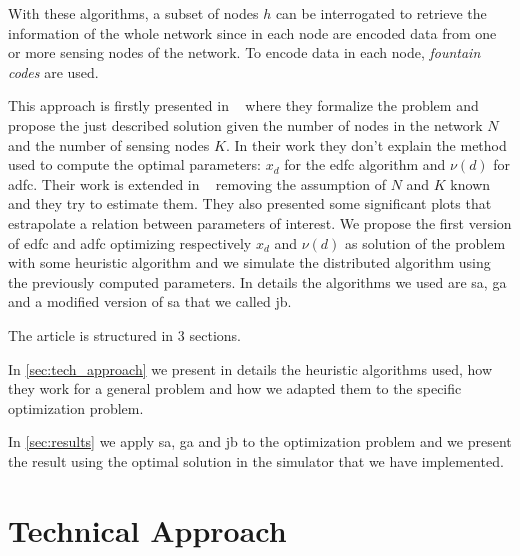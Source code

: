 \documentclass[journal]{IEEEtran}
\begin{document}
With these algorithms, a subset of nodes $h$ can be interrogated to retrieve the information of the whole network since in each node are encoded data from one or more sensing nodes of the network.
To encode data in each node, \textit{fountain codes} are used.

This approach is firstly presented in ~\cite{Lin2007} where they formalize the problem and propose the just described solution given the number of nodes in the network $N$ and the number of sensing nodes $K$. In their work they don't explain the method used to compute the optimal parameters: $x_d$ for the \gls{edfc} algorithm and $\nu(d)$ for \gls{adfc}. Their work is extended in ~\cite{Aly2008} removing the assumption of $N$ and $K$ known and they try to estimate them.
They also presented some significant plots that estrapolate a relation between parameters of interest.
We propose the first version of \gls{edfc} and \gls{adfc} optimizing respectively $x_d$ and $\nu(d)$ as solution of the problem with some heuristic algorithm and we simulate the distributed algorithm using the previously computed parameters.
In details the algorithms we used are \gls{sa}, \gls{ga} and a modified version of \gls{sa} that we called \gls{jb}.

The article is structured in 3 sections.

In \autoref{sec:tech_approach} we present in details the heuristic algorithms used, how they work for a general problem and how we adapted them to the specific optimization problem.

In \autoref{sec:results} we apply \gls{sa}, \gls{ga} and \gls{jb} to the optimization problem and we present the result using the optimal solution in the simulator that we have implemented.

\section{Technical Approach}
\label{sec:tech_approach}
\end{document}
